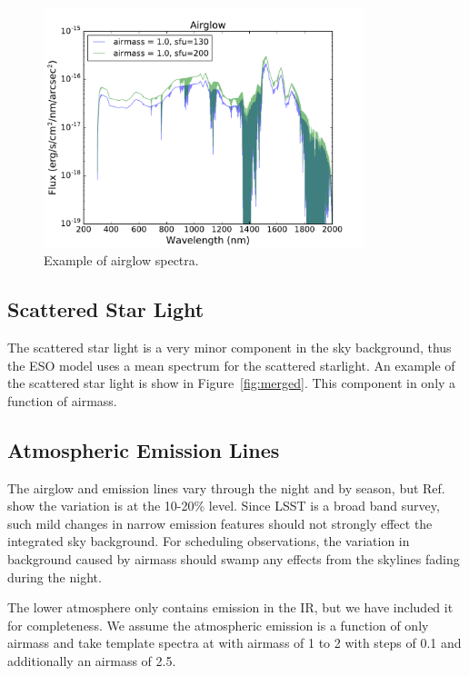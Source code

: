 \documentclass[]{spie}
\begin{document}
\begin{figure}[ht]
\begin{center}
  \includegraphics[height=7cm]{plots/airglow.pdf}
  \end{center}
  \caption{Example of airglow spectra. \label{fig:airglow}}
\end{figure}

  

\subsection{Scattered Star Light}

The scattered star light is a very minor component in the sky background, thus the ESO model uses a mean spectrum for the scattered starlight.  An example of the scattered star light is show in Figure~\ref{fig:merged}. This component in only a function of airmass.


\subsection{Atmospheric Emission Lines}

The airglow and emission lines vary through the night and by season, but Ref.~ show the variation is at the 10-20\% level.  Since LSST is a broad band survey, such mild changes in narrow emission features should not strongly effect the integrated sky background.  For scheduling observations, the variation in background caused by airmass should swamp any effects from the skylines fading during the night.

The lower atmosphere only contains emission in the IR, but we have included it for completeness.  We assume the atmospheric emission is a function of only airmass and take template spectra at with airmass of 1 to 2 with steps of 0.1 and additionally an airmass of 2.5.
\end{document}
